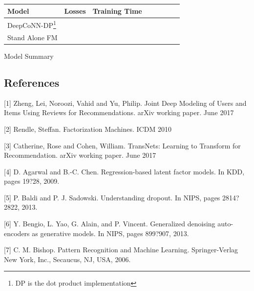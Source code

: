 \documentclass[10pt,twocolumn,letterpaper]{article}
\begin{document}
\begin{exhibit}
\begin{center}
{\small
\begin{tabular}{l|ccccccc}
\hline
Model & Losses & Training Time & & & &  &\\
\hline
DeepCoNN-DP\footnote{DP is the dot product implementation} & & & & & & & \\
Stand Alone FM & & & & & & &\\
\hline
\end{tabular}
}
\end{center}
\label{table2}
\caption{Model Summary}
\end{exhibit}

\subsection{References}

[1] Zheng, Lei, Noroozi, Vahid and Yu, Philip. Joint Deep Modeling of Users
 and Items Using Reviews for Recommendations. arXiv working paper. June 2017

[2] Rendle, Steffan. Factorization Machines. ICDM 2010

[3] Catherine, Rose and Cohen, William. TransNets: Learning to Transform
for Recommendation. arXiv working paper. June 2017

[4] D. Agarwal and B.-C. Chen. Regression-based latent
factor models. In KDD, pages 19?28, 2009.

[5] P. Baldi and P. J. Sadowski. Understanding dropout.
In NIPS, pages 2814?2822, 2013.

[6] Y. Bengio, L. Yao, G. Alain, and P. Vincent.
Generalized denoising auto-encoders as generative
models. In NIPS, pages 899?907, 2013.

[7] C. M. Bishop. Pattern Recognition and Machine
Learning. Springer-Verlag New York, Inc., Secaucus,
NJ, USA, 2006.
\end{document}
